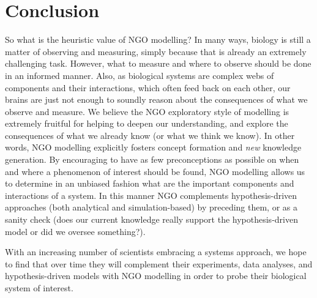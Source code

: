 \section{Conclusion}

So what is the heuristic value of NGO modelling? In many ways, biology is still a matter of observing and measuring, simply because that is already an extremely challenging task. However, what to measure and where to observe should be done in an informed manner. Also, as biological systems are complex webs of components and their interactions, which often feed back on each other, our brains are just not enough to soundly reason about the consequences of what we observe and measure. We believe the NGO exploratory style of modelling is extremely fruitful for helping to deepen our understanding, and explore the consequences of what we already know (or what we think we know). In other words, NGO modelling explicitly fosters concept formation and \emph{new} knowledge generation. By encouraging to have as few preconceptions as possible on when and where a phenomenon of interest should be found, NGO modelling allows us to determine in an unbiased fashion what are the important components and interactions of a system. In this manner NGO complements hypothesis-driven approaches (both analytical and simulation-based) by preceding them, or as a sanity check (does our current knowledge really support the hypothesis-driven model or did we oversee something?).

With an increasing number of scientists embracing a systems approach, we hope to find that over time they will complement their experiments, data analyses, and hypothesis-driven models with NGO modelling in order to probe their biological system of interest.